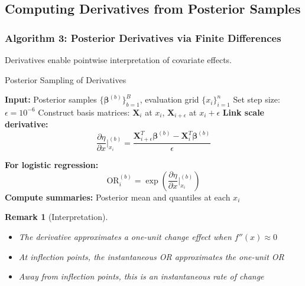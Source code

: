 \documentclass[12pt]{article}
\newtheorem{remark}{Remark}
\begin{document}
\subsection{Computing Derivatives from Posterior Samples}

\subsubsection{Algorithm 3: Posterior Derivatives via Finite Differences}

Derivatives enable pointwise interpretation of covariate effects.

\begin{algorithm}[H]
\caption{Posterior Sampling of Derivatives}
\begin{algorithmic}[1]
\State \textbf{Input:} Posterior samples $\{\boldsymbol{\beta}^{(b)}\}_{b=1}^B$, evaluation grid $\{x_i\}_{i=1}^n$
\State Set step size: $\epsilon = 10^{-6}$
\State Construct basis matrices: $\mathbf{X}_i$ at $x_i$, $\mathbf{X}_{i+\epsilon}$ at $x_i + \epsilon$
        \State \textbf{Link scale derivative:}
        \begin{equation}
        \frac{\partial \eta}{\partial x}\bigg|_{x_i}^{(b)} = \frac{\mathbf{X}_{i+\epsilon}^T\boldsymbol{\beta}^{(b)} - \mathbf{X}_i^T\boldsymbol{\beta}^{(b)}}{\epsilon}
        \end{equation}
        
        \State \textbf{For logistic regression:}
        \begin{equation}
        \text{OR}_i^{(b)} = \exp\left(\frac{\partial \eta}{\partial x}\bigg|_{x_i}^{(b)}\right)
        \end{equation}
    \EndFor
\EndFor
\State \textbf{Compute summaries:} Posterior mean and quantiles at each $x_i$
\end{algorithmic}
\end{algorithm}

\begin{remark}[Interpretation]
\begin{itemize}
    \item The derivative approximates a one-unit change effect when $f''(x) \approx 0$
    \item At inflection points, the instantaneous OR approximates the one-unit OR
    \item Away from inflection points, this is an instantaneous rate of change
\end{itemize}
\end{remark}
\end{document}
